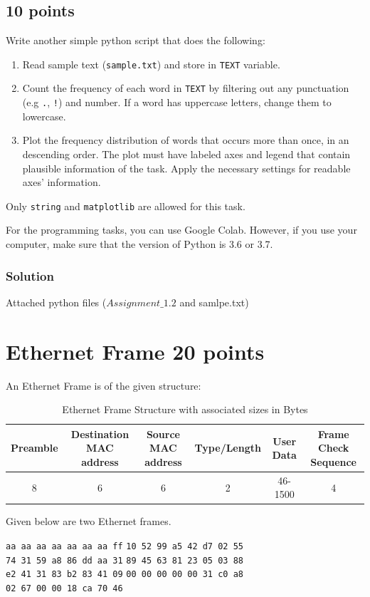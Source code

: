 \documentclass{resources/WeSTassignment}
\begin{document}
\subsection{\hfill{10 points}}
Write another simple python script that does the following:
\begin{enumerate}
    \item Read sample text (\texttt{sample.txt}) and store in \texttt{TEXT} variable.
    \item Count the frequency of each word in \texttt{TEXT} by filtering out any punctuation (e.g \texttt{.}, \texttt{!}) and number. If a word has uppercase letters, change them to lowercase.
    \item Plot the frequency distribution of words that occurs more than once, in an descending order. The plot must have labeled axes and legend that contain plausible information of the task. Apply the necessary settings for readable axes' information. 
\end{enumerate}
Only \texttt{string} and \texttt{matplotlib} are allowed for this task. 

For the programming tasks, you can use Google Colab. However, if you use your computer, make sure that the version of Python is 3.6 or 3.7.
\subsubsection{Solution}
Attached python files ($Assignment\_1.2$ and samlpe.txt) 

\section{Ethernet Frame \hfill{20 points}}
An Ethernet Frame is of the given structure:
\begin{table}[h]
    \centering
    \scriptsize
    \begin{tabular}{|c|c|c|c|c|c|}
    \hline
         Preamble & Destination MAC address & Source MAC address & Type/Length & User Data & Frame Check Sequence  \\ \hline
         8 & 6 & 6 & 2 & 46-1500 & 4 \\ \hline
    \end{tabular}
    \caption{Ethernet Frame Structure with associated sizes in Bytes}
    \label{tab:ethernet_frame_structure}
\end{table}

Given below are two Ethernet frames.

    \texttt{aa aa aa aa aa aa aa ff} \hspace{2cm} \texttt{10 52 99 a5 42 d7 02 55} \\
    \texttt{74 31 59 a8 86 dd aa 31} \hspace{2cm} \texttt{89 45 63 81 23 05 03 88} \\
    \texttt{e2 41 31 83 b2 83 41 09} \hspace{2cm} \texttt{00 00 00 00 00 31 c0 a8} \\
    \texttt{02 67 00 00 18 ca 70 46} \\
    
\end{document}

